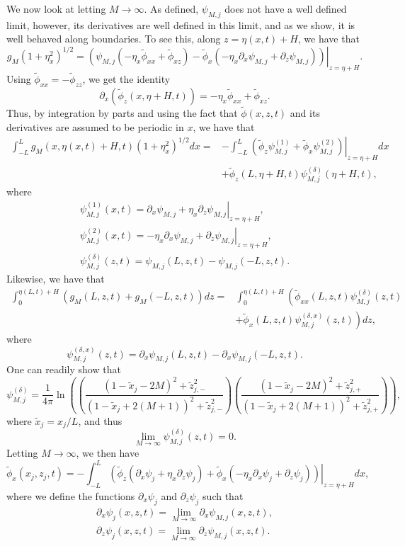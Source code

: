 \documentclass[a4paper,11pt]{article}
\newcommand{\p}{\partial}
\begin{document}
We now look at letting $M\rightarrow\infty$.  As defined, $\psi_{M,j}$ does not have a well defined limit, however, its derivatives are well defined in this limit, and as we show, it is well behaved along boundaries.  To see this, along $z = \eta(x,t) + H$, we have that 
\[
g_{M}(1+\eta_{x}^{2})^{1/2} = \left.\left(\psi_{M,j}\left(- \eta_{x}\tilde{\phi}_{xx}+\tilde{\phi}_{xz}\right)-\tilde{\phi}_{x}\left(-\eta_{x}\p_{x}\psi_{M,j}+\p_{z}\psi_{M,j}\right) \right)\right|_{z= \eta+H}.
\]
Using $\tilde{\phi}_{xx} = -\tilde{\phi}_{zz}$, we get the identity
\[
\p_{x}\left(\tilde{\phi}_{z}(x, \eta+H,t) \right) = -\eta_{x}\tilde{\phi}_{xx} + \tilde{\phi}_{xz}.
\]
Thus, by integration by parts and using the fact that $\tilde{\phi}(x,z,t)$ and its derivatives are assumed to be periodic in $x$, we have that 
\begin{align*}
\int_{-L}^{L}g_{M}(x,\eta(x,t)+H,t) (1+\eta_{x}^{2})^{1/2}dx = & -\int_{-L}^{L} \left.\left(\tilde{\phi}_{z}\psi^{(1)}_{M,j}+\tilde{\phi}_{x}\psi^{(2)}_{M,j}\right)\right|_{z=\eta+H}dx \\
& + \tilde{\phi}_{z}(L,\eta+H,t)\psi^{(\delta)}_{M,j}(\eta+H,t),
\end{align*}
where
\begin{align*}
\psi^{(1)}_{M,j}(x,t) = \left.\p_{x}\psi_{M,j}+ \eta_{x}\p_{z}\psi_{M,j}\right|_{z=\eta+H}, \\
\psi^{(2)}_{M,j}(x,t) = \left.-\eta_{x}\p_{x}\psi_{M,j} + \p_{z}\psi_{M,j}\right|_{z=\eta+H}, \\
\psi^{(\delta)}_{M,j}(z,t) = \psi_{M,j}(L,z,t)-\psi_{M,j}(-L,z,t).
\end{align*}
Likewise, we have that 
\begin{align*}
\int_{0}^{\eta(L,t)+H} \left(g_{M}(L,z,t) + g_{M}(-L,z,t)\right) dz = & \int_{0}^{\eta(L,t)+H} \left(\tilde{\phi}_{xx}(L,z,t)\psi^{(\delta)}_{M,j}(z,t) \right.  \\
&\left. + \tilde{\phi}_{x}(L,z,t)\psi^{(\delta,x)}_{M,j}(z,t) \right) dz, 
\end{align*}
where
\[
\psi^{(\delta,x)}_{M,j}(z,t) = \p_{x}\psi_{M,j}(L,z,t)-\p_{x}\psi_{M,j}(-L,z,t). 
\]
One can readily show that 
\[
\psi_{M,j}^{(\delta)} = \frac{1}{4\pi}\ln\left(\left(\frac{(1-\tilde{x}_{j}-2M)^{2}+\tilde{z}_{j,-}^{2}}{(1-\tilde{x}_{j}+2(M+1))^{2}+\tilde{z}_{j,-}^{2}}\right) \left(\frac{(1-\tilde{x}_{j}-2M)^{2}+\tilde{z}_{j,+}^{2}}{(1-\tilde{x}_{j}+2(M+1))^{2}+\tilde{z}_{j,+}^{2}}\right) \right),
\]
where $\tilde{x}_{j} = x_{j}/L$, and thus 
\[
\lim_{M\rightarrow\infty}\psi_{M,j}^{(\delta)}(z,t) = 0.
\]
Letting $M\rightarrow \infty$, we then have 
\[
\tilde{\phi}_{x}(x_{j},z_{j},t) = -\int_{-L}^{L} \left.\left(\tilde{\phi}_{z}\left(\p_{x}\psi_{j}+ \eta_{x}\p_{z}\psi_{j}\right)+\tilde{\phi}_{x}\left(-\eta_{x}\p_{x}\psi_{j} + \p_{z}\psi_{j} \right) \right)\right|_{z=\eta+H}dx,
\]
where we define the functions $\p_{x}\psi_{j}$ and $\p_{z}\psi_{j}$ such that 
\begin{align*}
\p_{x}\psi_{j}(x,z,t) = \lim_{M\rightarrow\infty}\p_{x}\psi_{M,j}(x,z,t), \\
\p_{z}\psi_{j}(x,z,t) = \lim_{M\rightarrow\infty}\p_{z}\psi_{M,j}(x,z,t).
\end{align*}
\end{document}
